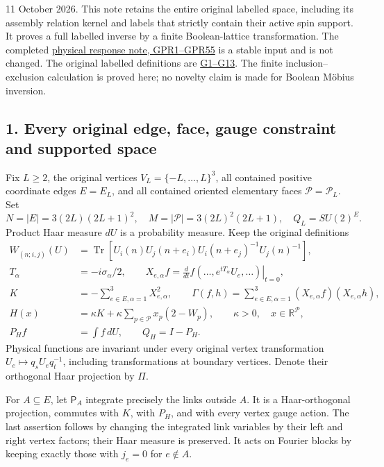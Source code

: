 \documentclass[11pt]{article}
\begin{document}
11 October 2026. This note retains the entire original labelled space, including its assembly relation kernel and labels that strictly contain their active spin support. It proves a full labelled inverse by a finite Boolean-lattice transformation. The completed \href{https://github.com/KokunoYumeto/yang-mills-interacting-workbench/blob/main/yang-mills/continuations/20261011-central-signs-shrinking-window/union_label_global/../GLOBAL_PHYSICAL_RESPONSE.md}{physical response note, GPR1–GPR55} is a stable input and is not changed. The original labelled definitions are \href{https://github.com/KokunoYumeto/yang-mills-interacting-workbench/blob/fa79faff2cd697e16cfa3a7953f36810c22c8922/yang-mills/continuations/20260915-gauge-native-band/RESEARCH_NOTE.md}{G1–G13}. The finite inclusion–exclusion calculation is proved here; no novelty claim is made for Boolean Möbius inversion.

\subsection*{1. Every original edge, face, gauge constraint and supported space}

Fix \(L\ge2\), the original vertices \(V_L=\{-L,\ldots,L\}^3\), all contained positive coordinate edges \(E=E_L\), and all contained oriented elementary faces \(\mathcal P=\mathcal P_L\). Set
\[
 N=|E|=3(2L)(2L+1)^2,\quad M=|\mathcal P|=3(2L)^2(2L+1),\quad
 Q_L=SU(2)^E.
 \tag{UL1}
\]
Product Haar measure \(dU\) is a probability measure. Keep the original definitions
\[
\begin{aligned}
 W_{(n;i,j)}(U)
 &=\operatorname{Tr}[U_i(n)U_j(n+e_i)U_i(n+e_j)^{-1}U_j(n)^{-1}],\\
 T_\alpha&=-i\sigma_\alpha/2,\qquad
 X_{e,\alpha}f=\left.\frac d{dt}f(\ldots,e^{tT_\alpha}U_e,\ldots)\right|_{t=0},\\
 K&=-\sum_{e\in E,\alpha=1}^3X_{e,\alpha}^2,\qquad
 \Gamma(f,h)=\sum_{e\in E,\alpha=1}^3(X_{e,\alpha}f)(X_{e,\alpha}h),\\
 H(x)&=\kappa K+\kappa\sum_{p\in\mathcal P}x_p(2-W_p),\qquad
 \kappa>0,\quad x\in\mathbb R^{\mathcal P},\\
 P_Hf&=\int f\,dU,\qquad Q_H=I-P_H.
\end{aligned}\tag{UL2}
\]
Physical functions are invariant under every original vertex transformation \(U_e\mapsto q_sU_eq_t^{-1}\), including transformations at boundary vertices. Denote their orthogonal Haar projection by \(\Pi\).

For \(A\subseteq E\), let \(\mathsf P_A\) integrate precisely the links outside \(A\). It is a Haar-orthogonal projection, commutes with \(K\), with \(P_H\), and with every vertex gauge action. The last assertion follows by changing the integrated link variables by their left and right vertex factors; their Haar measure is preserved. It acts on Fourier blocks by keeping exactly those with \(j_e=0\) for \(e\notin A\).
\end{document}
